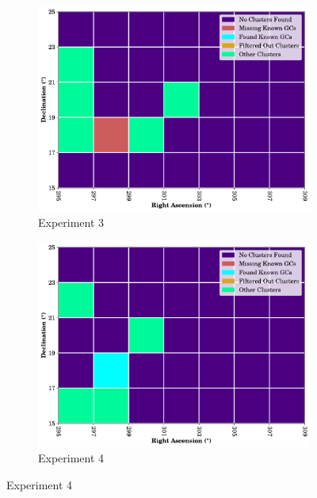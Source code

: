 \begin{figure}[H]
    \begin{subfigure}[b]{0.49\textwidth}
        \includegraphics[width=\textwidth]{./figures/rasters/grids/grid-run-03-a2.pdf}
        \caption{Experiment 3}
    \end{subfigure}
    \begin{subfigure}[b]{0.49\textwidth}
        \includegraphics[width=\textwidth]{./figures/rasters/grids/grid-run-04-a2.pdf}
        \caption{Experiment 4}
    \end{subfigure}


\end{figure}
